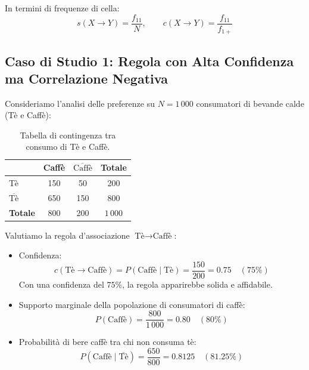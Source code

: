 In termini di frequenze di cella:
\begin{equation}
s(X \longrightarrow Y) = \frac{f_{11}}{N}, \qquad c(X \longrightarrow Y) = \frac{f_{11}}{f_{1+}}
\end{equation}

\FloatBarrier
\subsection{Caso di Studio 1: Regola con Alta Confidenza ma Correlazione Negativa}
Consideriamo l'analisi delle preferenze su $N = 1\,000$ consumatori di bevande calde (Tè e Caffè):

\begin{table}[H]
\centering
\small
\renewcommand{\arraystretch}{1.2}
\begin{tabular}{l c c c}
\toprule
& Caffè & $\overline{\text{Caffè}}$ & \textbf{Totale} \\
\midrule
Tè & 150 & 50 & 200 \\
$\overline{\text{Tè}}$ & 650 & 150 & 800 \\
\midrule
\textbf{Totale} & 800 & 200 & $1\,000$ \\
\bottomrule
\end{tabular}
\caption{Tabella di contingenza tra consumo di Tè e Caffè.}
\label{tab:dm-tea-coffee-paradox}
\end{table}

Valutiamo la regola d'associazione $\text{Tè} \longrightarrow \text{Caffè}$:
\begin{itemize}
    \item Confidenza:
    \begin{equation}
    c(\text{Tè} \longrightarrow \text{Caffè}) = P(\text{Caffè} \mid \text{Tè}) = \frac{150}{200} = 0.75 \quad (75\%)
    \end{equation}
    Con una confidenza del $75\%$, la regola apparirebbe solida e affidabile.
    \item Supporto marginale della popolazione di consumatori di caffè:
    \begin{equation}
    P(\text{Caffè}) = \frac{800}{1\,000} = 0.80 \quad (80\%)
    \end{equation}
    \item Probabilità di bere caffè tra chi non consuma tè:
    \begin{equation}
    P(\text{Caffè} \mid \overline{\text{Tè}}) = \frac{650}{800} = 0.8125 \quad (81.25\%)
    \end{equation}
\end{itemize}

